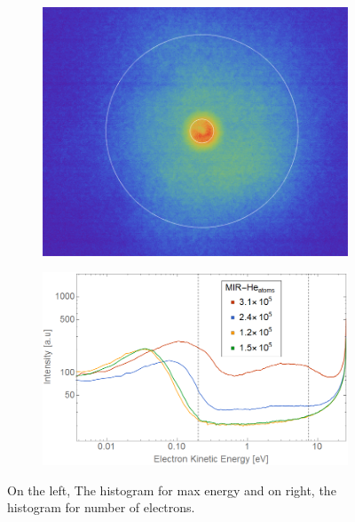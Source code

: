 \begin{figure}[h!]
\centering
\begin{subfigure}[l]{0.4\textwidth}
\includegraphics[width=1\textwidth]{../Images/results/Comparison_energyDistribution/MIr_He_10K5.png}   				\end{subfigure}
\begin{subfigure}[l]{0.59\textwidth}
\includegraphics[width=1\textwidth]{../Images/results/Comparison_energyDistribution/MIR_He_summed_energydist.png} 
\end{subfigure}

\caption[MIR He droplet scan histograms]{On the left, The histogram for max energy and on right, the histogram for number of electrons.}
\label{fig:MIRHeenergdist}
\end{figure}

